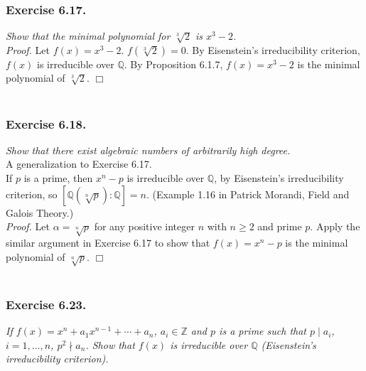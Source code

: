 \documentclass{article}
\begin{document}



\subsubsection*{Exercise 6.17.}
\emph{Show that the minimal polynomial for $\sqrt[3]{2}$ is $x^3 - 2$.} \\

\emph{Proof.}
Let $f(x) = x^3 - 2$. $f(\sqrt[3]{2}) = 0$.
By Eisenstein's irreducibility criterion, $f(x)$ is irreducible over $\mathbb{Q}$.
By Proposition 6.1.7, $f(x) = x^3 - 2$ is the minimal polynomial of $\sqrt[3]{2}$.
$\Box$ \\\\






\subsubsection*{Exercise 6.18.}
\emph{Show that there exist algebraic numbers of arbitrarily high degree.} \\

A generalization to Exercise 6.17. \\

If $p$ is a prime, then $x^n - p$ is irreducible over $\mathbb{Q}$,
by Eisenstein's irreducibility criterion, so
$[\mathbb{Q}(\sqrt[n]{p}):\mathbb{Q}] = n$.
(Example 1.16 in Patrick Morandi, Field and Galois Theory.) \\


\emph{Proof.}
Let $\alpha = \sqrt[n]{p}$ for any positive integer $n$ with $n \geq 2$
and prime $p$.
Apply the similar argument in Exercise 6.17 to show that
$f(x) = x^n - p$ is the minimal polynomial of $\sqrt[n]{p}$.
$\Box$ \\\\






\subsubsection*{Exercise 6.23.}
\emph{If $f(x) = x^n + a_1 x^{n-1} + \cdots + a_n$, $a_i \in \mathbb{Z}$
and $p$ is a prime such that $p \mid a_i$, $i = 1, ..., n$, $p^2 \nmid a_n$.
Show that $f(x)$ is irreducible over $\mathbb{Q}$
(Eisenstein's irreducibility criterion).} \\
\end{document}
